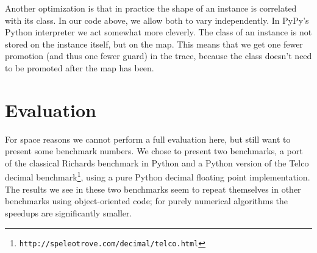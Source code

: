 \documentclass{sigplanconf}
\begin{document}
Another optimization is that in practice the shape of an instance is correlated
with its class. In our code above, we allow both to vary independently.
In PyPy's Python interpreter we act somewhat more cleverly. The class of
an instance is not stored on the instance itself, but on the map. This means
that we get one fewer promotion (and thus one fewer guard) in the trace,
because the class doesn't need to
be promoted after the map has been.



%
%




\section{Evaluation}
\label{sec:evaluation}

For space reasons we cannot perform a full evaluation here, but still want to
present some benchmark numbers. We chose to present two benchmarks, a port of
the classical Richards benchmark in Python and a Python version of the Telco
decimal benchmark\footnote{\texttt{http://speleotrove.com/decimal/telco.html}},
using a pure Python decimal floating point implementation. The results we see in
these two benchmarks seem to repeat themselves in other benchmarks using
object-oriented code; for purely numerical algorithms the speedups are 
significantly smaller.
\end{document}

